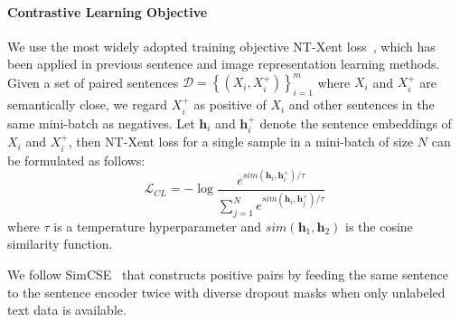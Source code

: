 \documentclass[11pt]{article}
\begin{document}
\paragraph{Contrastive Learning Objective}We use the most widely adopted training objective NT-Xent loss~\cite{Chen2020simclr, gao2021simcse}, which has been applied in previous sentence and image representation learning methods. Given a set of paired sentences $\mathcal{D}=\left\{ (X_{i}, X_{i}^+) \right\}_{i=1}^m$ where $X_{i}$ and $X_{i}^+$ are semantically close, we regard $X_{i}^+$ as positive of $X_{i}$ and other sentences in the same mini-batch as negatives. Let $\textbf{h}_{i}$ and $\textbf{h}_{i}^+$ denote the sentence embeddings of $X_{i}$ and $X_{i}^+$, then NT-Xent loss for a single sample in a mini-batch of size $N$ can be formulated as follows:
\begin{equation}
\mathcal{L}_{CL}=-\log\frac{e^{sim(\textbf{h}_{i}, \textbf{h}_{i}^+)/\tau}}{\sum_{j=1}^Ne^{sim(\textbf{h}_{i}, \textbf{h}_{j}^+)/\tau}}
\label{equation: contrastive}
\end{equation}
where $\tau$ is a temperature hyperparameter and $sim(\textbf{h}_{1}, \textbf{h}_{2})$ is the cosine similarity function.

We follow SimCSE~\cite{gao2021simcse} that constructs positive pairs by feeding the same sentence to the sentence encoder twice with diverse dropout masks when only unlabeled text data is available.
\end{document}
